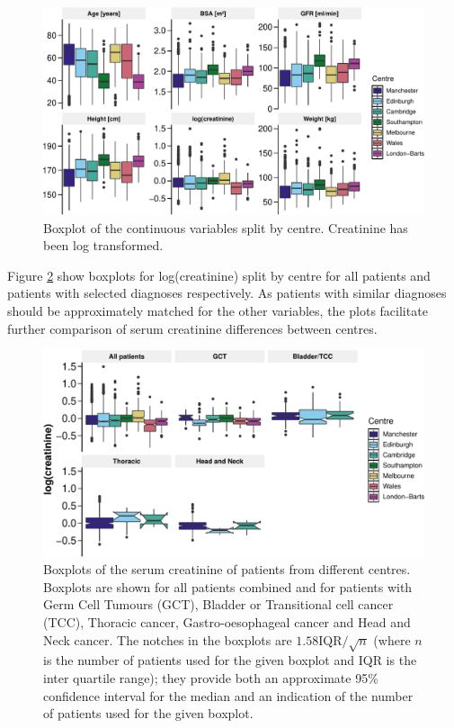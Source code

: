 \documentclass[11pt,]{article}
\begin{document}
\begin{figure}
\centering
\includegraphics{1_Validation_nonIDMS_resubmission_files/figure-latex/data_characteristics_plot_1-1.pdf}
\caption{\label{fig:centre_boxplot}Boxplot of the continuous variables
split by centre. Creatinine has been log transformed.}
\end{figure}

Figure \ref{fig:boxplot_creat} show boxplots for log(creatinine) split
by centre for all patients and patients with selected diagnoses
respectively. As patients with similar diagnoses should be approximately
matched for the other variables, the plots facilitate further comparison
of serum creatinine differences between centres.

\begin{figure}
\centering
\includegraphics{1_Validation_nonIDMS_resubmission_files/figure-latex/PLOT_analyse_creatinine-1.pdf}
\caption{\label{fig:boxplot_creat}Boxplots of the serum creatinine of
patients from different centres. Boxplots are shown for all patients
combined and for patients with Germ Cell Tumours (GCT), Bladder or
Transitional cell cancer (TCC), Thoracic cancer, Gastro-oesophageal
cancer and Head and Neck cancer. The notches in the boxplots are
\(1.58 \text{IQR} / \sqrt{n}\) (where \(n\) is the number of patients
used for the given boxplot and IQR is the inter quartile range); they
provide both an approximate 95\% confidence interval for the median and
an indication of the number of patients used for the given boxplot.}
\end{figure}
\end{document}
